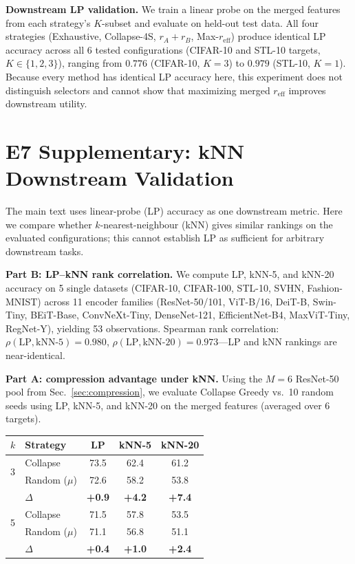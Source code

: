 \documentclass{article}
\newcommand{\reff}{\ensuremath{r_{\mathrm{eff}}}\xspace}
\begin{document}
\textbf{Downstream LP validation.}
We train a linear probe on the merged features from each strategy's
$K$-subset and evaluate on held-out test data.
All four strategies (Exhaustive, Collapse-4S, $r_A{+}r_B$, Max-$\reff$)
produce identical LP accuracy across all 6 tested configurations
(CIFAR-10 and STL-10 targets, $K{\in}\{1,2,3\}$),
ranging from $0.776$ (CIFAR-10, $K{=}3$) to $0.979$ (STL-10, $K{=}1$).
Because every method has identical LP accuracy here, this experiment does
not distinguish selectors and cannot show that maximizing merged $\reff$
improves downstream utility.

\section{E7 Supplementary: kNN Downstream Validation}
\label{app:e7_knn}

The main text uses linear-probe (LP) accuracy as one downstream metric.
Here we compare whether $k$-nearest-neighbour (kNN) gives similar rankings
on the evaluated configurations; this cannot establish LP as sufficient for
arbitrary downstream tasks.

\textbf{Part B: LP--kNN rank correlation.}
We compute LP, kNN-5, and kNN-20 accuracy on 5 single datasets
(CIFAR-10, CIFAR-100, STL-10, SVHN, Fashion-MNIST) across 11 encoder
families (ResNet-50/101, ViT-B/16, DeiT-B, Swin-Tiny, BEiT-Base,
ConvNeXt-Tiny, DenseNet-121, EfficientNet-B4, MaxViT-Tiny, RegNet-Y),
yielding 53 observations.
Spearman rank correlation: $\rho(\text{LP},\text{kNN-5}){=}0.980$,
$\rho(\text{LP},\text{kNN-20}){=}0.973$---LP and kNN rankings are
near-identical.

\textbf{Part A: compression advantage under kNN.}
Using the $M{=}6$ ResNet-50 pool from Sec.~\ref{sec:compression},
we evaluate Collapse Greedy vs.\ 10 random seeds using LP, kNN-5,
and kNN-20 on the merged features (averaged over 6 targets).

\begin{center}
\setlength{\tabcolsep}{4pt}
\small
\begin{tabular}{llccc}
\toprule
$k$ & Strategy & LP & kNN-5 & kNN-20 \\
\midrule
\multirow{2}{*}{3}
  & Collapse & 73.5 & 62.4 & 61.2 \\
  & Random ($\mu$) & 72.6 & 58.2 & 53.8 \\
  & $\Delta$ & \textbf{+0.9} & \textbf{+4.2} & \textbf{+7.4} \\
\midrule
\multirow{2}{*}{5}
  & Collapse & 71.5 & 57.8 & 53.5 \\
  & Random ($\mu$) & 71.1 & 56.8 & 51.1 \\
  & $\Delta$ & \textbf{+0.4} & \textbf{+1.0} & \textbf{+2.4} \\
\bottomrule
\end{tabular}
\end{center}
\end{document}
